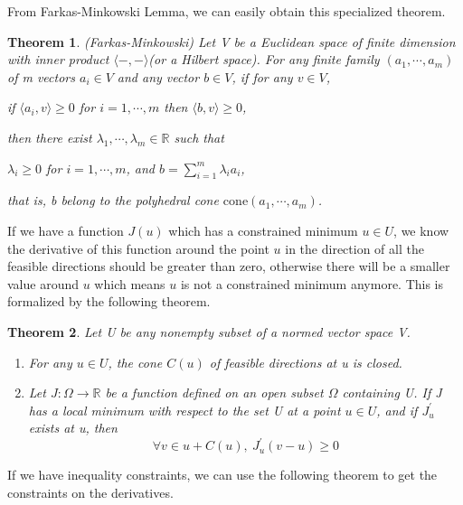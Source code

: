 \documentclass[a4paper,12pt]{report}
\newtheorem{theorem}{Theorem}[section]
\begin{document}
From Farkas-Minkowski Lemma, we can easily obtain this specialized theorem. 
\begin{theorem}
    (Farkas-Minkowski\cite{gallier2019algebra}) Let V be a Euclidean space of finite dimension with inner product $\langle -,-\rangle$(or a Hilbert space). For any finite family $(a_1,\cdots,a_m)$ of m vectors $a_i\in V$ and any vector $b\in V$, if for any $v\in V$,
    \begin{center}
        if $\langle a_i, v\rangle \geq 0$ for $i=1,\cdots,m$ then $\langle b,v\rangle\geq 0$,
    \end{center}
    then there exist $\lambda_1,\cdots,\lambda_m\in \mathbb R$ such that
    \begin{center}
        $\lambda_i\geq 0$ for $i=1,\cdots,m$, and $b=\sum\limits_{i=1}^m \lambda_ia_i$,
    \end{center}
    that is, b belong to the polyhedral cone $\mathrm{cone} (a_1,\cdots,a_m)$.
\end{theorem}

If we have a function $J(u)$ which has a constrained minimum $u\in U$, we know the derivative of this function around the point $u$ in the direction of all the feasible directions should be greater than zero, otherwise there will be a smaller value around $u$ which means $u$ is not a constrained minimum anymore. This is formalized by the following theorem.

\begin{theorem}
    Let U be any nonempty subset of a normed vector space V.
    \begin{enumerate}[label={(\arabic*)}]
        \item For any $u\in U$, the cone $C(u)$ of feasible directions at u is closed.
        \item Let $J:\Omega\to \mathbb R$ be a function defined on an open subset $\Omega$ containing U. If J has a local minimum with respect to the set U at a point $u\in U$, and if $J^\prime_u$ exists at u, then
            \[
                \forall v\in u+C(u),\ J^\prime_u(v-u)\geq 0
            \]
    \end{enumerate}
\end{theorem}

If we have inequality constraints, we can use the following theorem to get the constraints on the derivatives.
\end{document}
